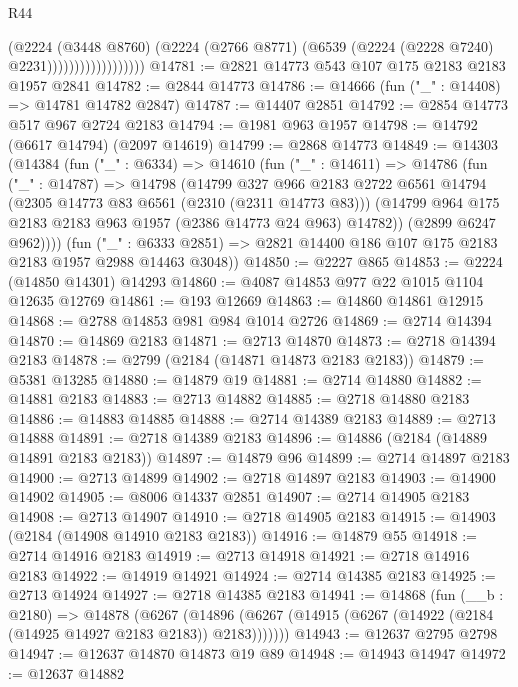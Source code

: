 \begin{lexlean}{R44}
\begin{coremodule}
                                (@2224
                                  (@3448 @8760)
                                  (@2224
                                    (@2766 @8771)
                                    (@6539 (@2224 (@2228 @7240) @2231))))))))))))))))))
@14781 := @2821 @14773 @543 @107 @175 @2183 @2183 @1957 @2841
@14782 := @2844 @14773
@14786 := @14666 (fun ("_" : @14408) => @14781 @14782 @2847)
@14787 := @14407 @2851
@14792 := @2854 @14773 @517 @967 @2724 @2183
@14794 := @1981 @963 @1957
@14798 := @14792 (@6617 @14794) (@2097 @14619)
@14799 := @2868 @14773
@14849 := @14303
    (@14384
      (fun ("_" : @6334) =>
      @14610
        (fun ("_" : @14611) =>
        @14786
          (fun ("_" : @14787) =>
          @14798
            (@14799
              @327
              @966
              @2183
              @2722
              @6561
              @14794
              (@2305 @14773 @83 @6561 (@2310 (@2311 @14773 @83)))
              (@14799 @964 @175 @2183 @2183 @963 @1957 (@2386 @14773 @24 @963) @14782))
            (@2899 @6247 @962))))
      (fun ("_" : @6333 @2851) => @2821 @14400 @186 @107 @175 @2183 @2183 @1957 @2988 @14463 @3048))
@14850 := @2227 @865
@14853 := @2224 (@14850 @14301) @14293
@14860 := @4087 @14853 @977 @22 @1015 @1104 @12635 @12769
@14861 := @193 @12669
@14863 := @14860 @14861 @12915
@14868 := @2788 @14853 @981 @984 @1014 @2726
@14869 := @2714 @14394
@14870 := @14869 @2183
@14871 := @2713 @14870
@14873 := @2718 @14394 @2183
@14878 := @2799 (@2184 (@14871 @14873 @2183 @2183))
@14879 := @5381 @13285
@14880 := @14879 @19
@14881 := @2714 @14880
@14882 := @14881 @2183
@14883 := @2713 @14882
@14885 := @2718 @14880 @2183
@14886 := @14883 @14885
@14888 := @2714 @14389 @2183
@14889 := @2713 @14888
@14891 := @2718 @14389 @2183
@14896 := @14886 (@2184 (@14889 @14891 @2183 @2183))
@14897 := @14879 @96
@14899 := @2714 @14897 @2183
@14900 := @2713 @14899
@14902 := @2718 @14897 @2183
@14903 := @14900 @14902
@14905 := @8006 @14337 @2851
@14907 := @2714 @14905 @2183
@14908 := @2713 @14907
@14910 := @2718 @14905 @2183
@14915 := @14903 (@2184 (@14908 @14910 @2183 @2183))
@14916 := @14879 @55
@14918 := @2714 @14916 @2183
@14919 := @2713 @14918
@14921 := @2718 @14916 @2183
@14922 := @14919 @14921
@14924 := @2714 @14385 @2183
@14925 := @2713 @14924
@14927 := @2718 @14385 @2183
@14941 := @14868
    (fun (__b : @2180) =>
    @14878
      (@6267 (@14896 (@6267 (@14915 (@6267 (@14922 (@2184 (@14925 @14927 @2183 @2183)) @2183)))))))
@14943 := @12637 @2795 @2798
@14947 := @12637 @14870 @14873 @19 @89
@14948 := @14943 @14947
@14972 := @12637
    @14882

\end{coremodule}
\end{lexlean}
